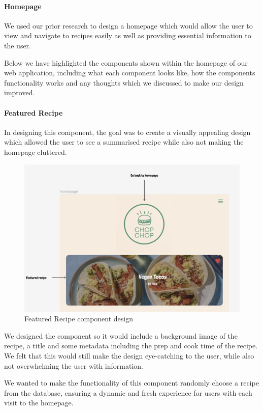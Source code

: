 \documentclass{article}
\begin{document}
\paragraph{Homepage}
We used our prior research to design a homepage which would allow the user to
view and navigate to recipes easily as well as providing essential information
to the user.

Below we have highlighted the components shown within the homepage of our web
application, including what each component looks like, how the components
functionality works and any thoughts which we discussed to make our design
improved.

\paragraph{Featured Recipe}
In designing this component, the goal was to create a visually appealing design
which allowed the user to see a summarised recipe while also not making the
homepage cluttered.

\begin{figure}[h]
  \includegraphics[width=1.0\textwidth]{assets/design-images/Version 1 Featured Recipe.png}
  \centering
  \caption{Featured Recipe component design}
\end{figure}

We designed the component so it would include a background image of the recipe,
a title and some metadata including the prep and cook time of the recipe. We
felt that this would still make the design eye-catching to the user, while also
not overwhelming the user with information.

We wanted to make the functionality of this component randomly choose a recipe
from the database, ensuring a dynamic and fresh experience for users with each
visit to the homepage.
\end{document}
